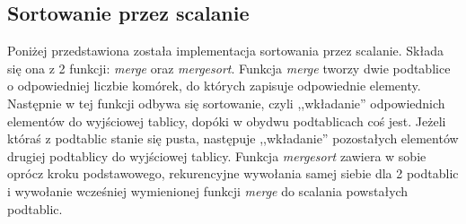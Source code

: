 \subsection{Sortowanie przez scalanie}
Poniżej przedstawiona została implementacja sortowania przez scalanie. Składa się ona z 2 funkcji: \textit{merge} oraz \textit{mergesort}. Funkcja \textit{merge} tworzy dwie podtablice o odpowiedniej liczbie komórek, do których zapisuje odpowiednie elementy. Następnie w tej funkcji odbywa się sortowanie, czyli ,,wkładanie'' odpowiednich elementów do wyjściowej tablicy, dopóki w obydwu podtablicach coś jest. Jeżeli któraś z podtablic stanie się pusta, następuje ,,wkładanie'' pozostałych elementów drugiej podtablicy do wyjściowej tablicy. Funkcja \textit{mergesort} zawiera w sobie oprócz kroku podstawowego, rekurencyjne wywołania samej siebie dla 2 podtablic i wywołanie wcześniej wymienionej funkcji \textit{merge} do scalania powstałych podtablic.

